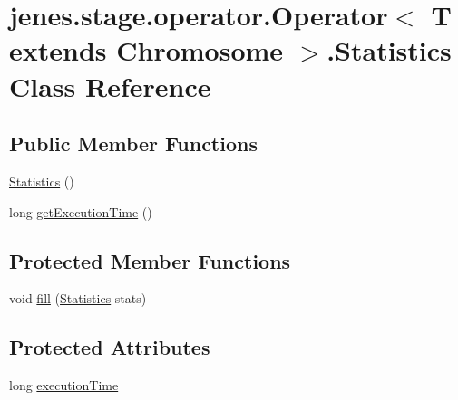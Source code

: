 \hypertarget{classjenes_1_1stage_1_1operator_1_1_operator_3_01_t_01extends_01_chromosome_01_4_1_1_statistics}{\section{jenes.\-stage.\-operator.\-Operator$<$ T extends Chromosome $>$.Statistics Class Reference}
\label{classjenes_1_1stage_1_1operator_1_1_operator_3_01_t_01extends_01_chromosome_01_4_1_1_statistics}
}
\subsection*{Public Member Functions}
\begin{DoxyCompactItemize}
\item 
\hyperlink{classjenes_1_1stage_1_1operator_1_1_operator_3_01_t_01extends_01_chromosome_01_4_1_1_statistics_adaa59a7b449045b5fd3c9abd3fbecf23}{Statistics} ()
\item 
long \hyperlink{classjenes_1_1stage_1_1operator_1_1_operator_3_01_t_01extends_01_chromosome_01_4_1_1_statistics_a7ad4b3ece9b2cdbf4a9142eda087a12d}{get\-Execution\-Time} ()
\end{DoxyCompactItemize}
\subsection*{Protected Member Functions}
\begin{DoxyCompactItemize}
\item 
void \hyperlink{classjenes_1_1stage_1_1operator_1_1_operator_3_01_t_01extends_01_chromosome_01_4_1_1_statistics_a26f2fb7bb11b9d05d95705ec95f470cf}{fill} (\hyperlink{classjenes_1_1stage_1_1operator_1_1_operator_3_01_t_01extends_01_chromosome_01_4_1_1_statistics_adaa59a7b449045b5fd3c9abd3fbecf23}{Statistics} stats)
\end{DoxyCompactItemize}
\subsection*{Protected Attributes}
\begin{DoxyCompactItemize}
\item 
long \hyperlink{classjenes_1_1stage_1_1operator_1_1_operator_3_01_t_01extends_01_chromosome_01_4_1_1_statistics_a3e7fc955df9ca708795c24336b12f937}{execution\-Time}
\end{DoxyCompactItemize}


